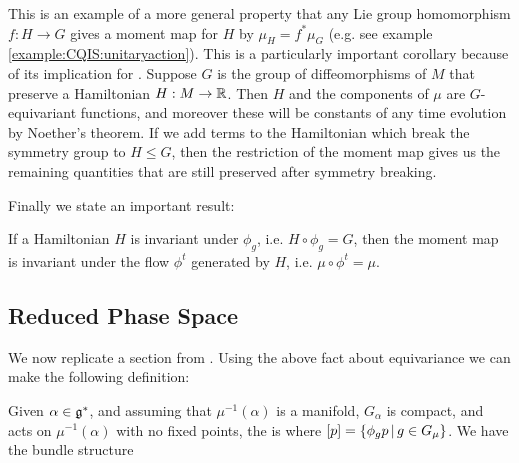 \documentclass{article}
\begin{document}
\begin{remark}
This is an example of a more general property that any Lie group homomorphism $f : H \to G$ gives a moment map for $H$ by $\mu_H = f^\ast \mu_G$ (e.g. see example \ref{example:CQIS:unitaryaction}). This is a particularly important corollary because of its implication for . Suppose $G$ is the group of diffeomorphisms of $M$ that preserve a Hamiltonian $H:M \to \mathbb{R}$. Then $H$ and the components of $\mu$ are $G$-equivariant functions, and moreover these will be constants of any time evolution by Noether's theorem. If we add terms to the Hamiltonian which break the symmetry group to $H \leq G$, then the restriction of the moment map gives us the remaining quantities that are still preserved after symmetry breaking.  
\end{remark}

Finally we state an important result:

\begin{prop}
	If a Hamiltonian $H$ is invariant under $\phi_g$, i.e. $H\circ \phi_g = G$, then the moment map is invariant under the flow $\phi^t$ generated by $H$, i.e. $\mu \circ  \phi^t = \mu$.
\end{prop}

\subsection{Reduced Phase Space}
We now replicate a section from \cite{Moser2010}. Using the above fact about equivariance we can make the following definition:
\begin{definition}
	Given $\alpha \in \mathfrak{g}^\ast$, and assuming that $\mu^{-1}(\alpha)$ is a manifold, $G_\alpha$ is compact, and acts on $\mu^{-1}(\alpha)$ with no fixed points, the  is 
	where $[p] = \left\{ \phi_g p \, | \, g \in G_\mu \right\}$. 
	We have the bundle structure 
	\begin{center}
	\end{center}
\end{definition}
\end{document}
